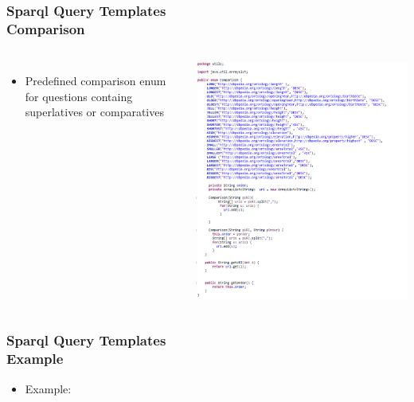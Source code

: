 \documentclass{beamer}
\begin{document}
\begin{frame}
\frametitle{Sparql Query Templates \\ {\small Comparison}}
\begin{columns}[c] %
	
	\begin{itemize}
		\item Predefined comparison enum for questions containg superlatives or comparatives
	\end{itemize}
	
	\includegraphics[scale=0.38]{Comparison.PNG}
	
\end{columns}
\end{frame}

\begin{frame}
\frametitle{Sparql Query Templates \\ {\normalsize Example }}
	\begin{itemize}
	\item Example:
	\end{itemize}
\end{frame}
\end{document}

